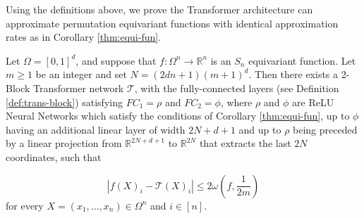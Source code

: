 \documentclass[twoside,11pt]{article}
\newcommand{\cT}{\mathcal{T}}
\begin{document}
Using the definitions above, we prove the Transformer architecture can approximate permutation equivariant functions with identical approximation rates as in Corollary \ref{thm:equi-fun}.

\begin{cor}\label{cor:tr}
    Let $\Omega = [0,1]^d$, and suppose that $f:\Omega^n\rightarrow \mathbb{R}^n$ is an $S_n$ equivariant function. Let $m \geq 1$ be an integer and set $N = (2dn+1)(m+1)^d$. Then there exists a 2-Block Transformer network  $\cT$, with the fully-connected layers (see Definition \ref{def:trans-block}) satisfying $FC_1 = \rho$ and $FC_2 = \phi$, where $\rho$ and $\phi$ are ReLU Neural Networks which satisfy the conditions of Corollary \ref{thm:equi-fun}, up to $\phi$ having an additional linear layer of width $2N + d + 1$ and up to $\rho$ being preceded by a linear projection from $\mathbb{R}^{2N+d+1}$ to $\mathbb{R}^{2N}$ that extracts the last $2N$ coordinates, such that

    \begin{equation}\label{deep-sets-equation-bound-snir-trans}
        \left|f(X)_i - \cT(X)_i \right| \leq 2\omega\left(f,\frac{1}{2m}\right)
    \end{equation}
    for every $X = (x_1,...,x_n)\in \Omega^n$ and $i\in [n]$. 

    
    
\end{cor}
\end{document}
